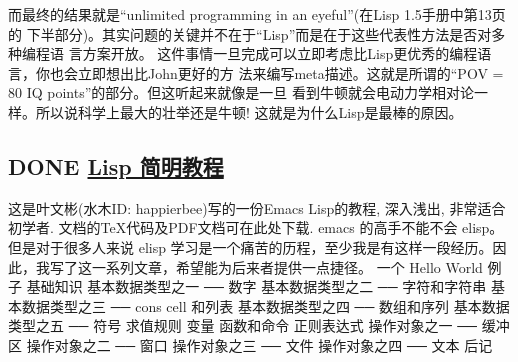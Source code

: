 \documentclass[11pt]{ctexart}
\begin{document}
而最终的结果就是“unlimited programming in an eyeful”(在Lisp 1.5手册中第13页的
下半部分)。其实问题的关键并不在于“Lisp”而是在于这些代表性方法是否对多种编程语
言方案开放。
这件事情一旦完成可以立即考虑比Lisp更优秀的编程语言，你也会立即想出比John更好的方
法来编写meta描述。这就是所谓的“POV = 80 IQ points”的部分。但这听起来就像是一旦
看到牛顿就会电动力学相对论一样。所以说科学上最大的壮举还是牛顿!
这就是为什么Lisp是最棒的原因。
\subsection{{\bfseries\sffamily DONE} \href{http://smacs.github.io/elisp/}{Lisp 简明教程}}
\label{sec:orgeda52fd}
这是叶文彬(水木ID: happierbee)写的一份Emacs Lisp的教程, 深入浅出, 非常适合初学者. 文档的\TeX{}代码及PDF文档可在此处下载.
emacs 的高手不能不会 elisp。但是对于很多人来说 elisp 学习是一个痛苦的历程，至少我是有这样一段经历。因此，我写了这一系列文章，希望能为后来者提供一点捷径。
一个 Hello World 例子
基础知识
基本数据类型之一 ── 数字
基本数据类型之二 ── 字符和字符串
基本数据类型之三 ── cons cell 和列表
基本数据类型之四 ── 数组和序列
基本数据类型之五 ── 符号
求值规则
变量
函数和命令
正则表达式
操作对象之一 ── 缓冲区
操作对象之二 ── 窗口
操作对象之三 ── 文件
操作对象之四 ── 文本
后记
\end{document}
